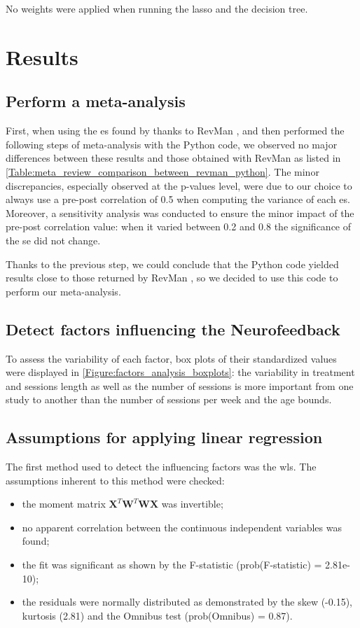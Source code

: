 \documentclass[12pt,a4paper,english]{article}
\begin{document}
No weights were applied when running the \gls{lasso} and the decision tree.

\section{Results}

\subsection{Perform a meta-analysis}

First, when using the \gls{es} found by \citet{Cortese2016} thanks to RevMan \citep{RevMan}, and then performed the following steps 
of meta-analysis with the Python code, we observed no major differences between these results and those obtained with RevMan \citep{RevMan} 
as listed in \ref{Table:meta_review_comparison_between_revman_python}. The minor discrepancies, especially observed at the p-values level,
were due to our choice to always use a pre-post correlation of 0.5 when computing the variance of each \gls{es}. Moreover, a sensitivity 
analysis was conducted to ensure the minor impact of the pre-post correlation value: when it varied between 0.2 and 0.8 the significance 
of the \gls{se} did not change. 

Thanks to the previous step, we could conclude that the Python code yielded results close to those returned by RevMan \citet{RevMan}, so we decided to
use this code to perform our meta-analysis.		

\subsection{Detect factors influencing the Neurofeedback}
		
To assess the variability of each factor, box plots of their standardized values were displayed in \cref{Figure:factors_analysis_boxplots}: 
the variability in treatment and sessions length as well as the number of sessions is more important from one study to another
than the number of sessions per week and the age bounds.  

\subsection{Assumptions for applying linear regression}

The first method used to detect the influencing factors was the \gls{wls}. The assumptions inherent to this method were checked: 
\begin{itemize}
	\item the moment matrix ${\textbf{X}}^{T}\textbf{W}^{T}\textbf{WX}$ was invertible;
  \item no apparent correlation between the continuous independent variables was found; 
  \item the fit was significant as shown by the F-statistic (prob(F-statistic) = 2.81e-10); 
  \item the residuals were normally distributed as demonstrated by the skew (-0.15), kurtosis (2.81) and the Omnibus test (prob(Omnibus) = 0.87).
\end{itemize} 
\end{document}
